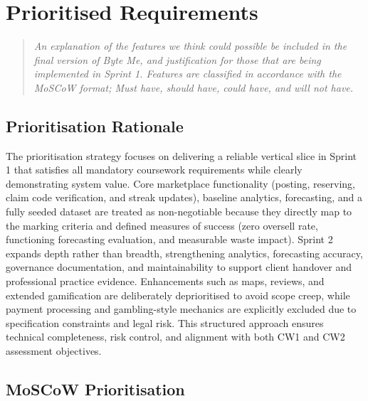 \documentclass[11pt, a4paper]{report}
\newenvironment{motivation}{\begin{quotation}\noindent\small\itshape}{\end{quotation}}
\begin{document}
	\chapter{Prioritised Requirements}
	\begin{motivation}
		An explanation of the features we think could possible be included in the final version of Byte Me, and justification for those that are being implemented in Sprint 1. Features are classified in accordance with the MoSCoW format; Must have, should have, could have, and will not have.
	\end{motivation}
	
	\section{Prioritisation Rationale}
	
	The prioritisation strategy focuses on delivering a reliable vertical slice in Sprint 1 that satisfies all mandatory coursework requirements while clearly demonstrating system value. Core marketplace functionality (posting, reserving, claim code verification, and streak updates), baseline analytics, forecasting, and a fully seeded dataset are treated as non-negotiable because they directly map to the marking criteria and defined measures of success (zero oversell rate, functioning forecasting evaluation, and measurable waste impact). Sprint 2 expands depth rather than breadth, strengthening analytics, forecasting accuracy, governance documentation, and maintainability to support client handover and professional practice evidence. Enhancements such as maps, reviews, and extended gamification are deliberately deprioritised to avoid scope creep, while payment processing and gambling-style mechanics are explicitly excluded due to specification constraints and legal risk. This structured approach ensures technical completeness, risk control, and alignment with both CW1 and CW2 assessment objectives.
	
	\section{MoSCoW Prioritisation}
	
	\renewcommand{\arraystretch}{1.25}
	
\end{document}
